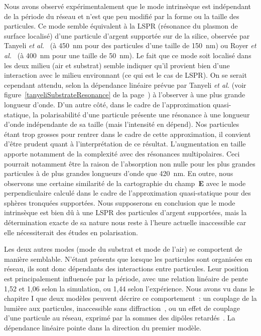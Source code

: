 Nous avons observé expérimentalement que le mode intrinsèque est indépendant de la période du réseau et n'est que peu modifié par la forme ou la taille des particules. Ce mode semble équivalent à la LSPR (résonance du plasmon de surface localisé) d'une particule d'argent supportée sur de la silice, observée par Tanyeli \textit{et al.}~\cite{tanyeli2013effect} (à 450~nm pour des particules d'une taille de 150~nm) ou Royer \textit{et al.}~\cite{royer1987substrate} (à 400~nm pour une taille de 50~nm). Le fait que ce mode soit localisé dans les deux milieu (air et substrat) semble indiquer qu'il provient bien d'une interaction avec le milieu environnant (ce qui est le cas de LSPR). On se serait cependant attendu, selon la dépendance linéaire prévue par Tanyeli \textit{et al.} (voir figure~\ref{tanyeliSubstrateResonance} de la page~\pageref{tanyeliSubstrateResonance}) à l'observer à une plus grande longueur d'onde. D'un autre côté, dans le cadre de l'approximation quasi-statique, la polarisabilité d'une particule présente une résonance à une longueur d'onde indépendante de sa taille (mais l'intensité en dépend). Nos particules étant trop grosses pour rentrer dans le cadre de cette approximation, il convient d'être prudent quant à l'interprétation de ce résultat. L'augmentation en taille apporte notamment de la complexité avec des résonances multipolaires. Ceci pourrait notamment être la raison de l'absorption non nulle pour les plus grandes particules à de plus grandes longueurs d'onde que 420~nm. En outre, nous observons une certaine similarité de la cartographie du champ~\textbf{E} avec le mode perpendiculaire calculé dans le cadre de l'approximation quasi-statique pour des sphères tronquées supportées.  Nous supposerons en conclusion que le mode intrinsèque est bien dû à une LSPR des particules d'argent supportées, mais la détermination exacte de sa nature nous reste à l'heure actuelle inaccessible car elle nécessiterait des études en polarisation.\par 
Les deux autres modes (mode du substrat et mode de l'air) se comportent de manière semblable. N'étant présents que lorsque les particules sont organisées en réseau, ils sont donc dépendants des interactions entre particules. Leur position est principalement influencée par la période, avec une relation linéaire de pente 1,52 et 1,06 selon la simulation, ou 1,44 selon l'expérience. 
Nous avons vu dans le chapitre I que deux modèles peuvent décrire ce comportement~: un couplage de la lumière aux particules, inaccessible sans diffraction~\cite{kravets2008extremely}, ou un effet de couplage d'une particule au réseau, exprimé par la sommes des dipôles retardés~\cite{zou2004narrow}. La dépendance linéaire pointe dans la direction du premier modèle.\par 
